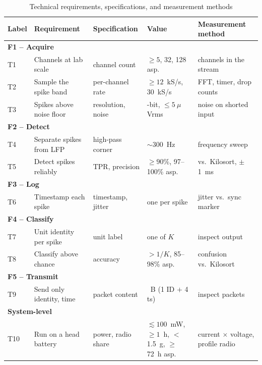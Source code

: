 \documentclass[11pt]{article}
\begin{document}
\begin{table}[H]
\centering
\caption{Technical requirements, specifications, and measurement methods}
\label{tab:techreq}
{\footnotesize\sffamily
\setlength{\tabcolsep}{4pt}
\renewcommand{\arraystretch}{1.2}
\begin{tabular}{|l|>{\raggedright\arraybackslash}p{106pt}|>{\raggedright\arraybackslash}p{78pt}|>{\raggedright\arraybackslash}p{90pt}|>{\raggedright\arraybackslash}p{112pt}|}
\hline
\textbf{Label} & \textbf{Requirement} & \textbf{Specification} & \textbf{Value} & \textbf{Measurement method} \\
\hline
\multicolumn{5}{|l|}{\textbf{F1 -- Acquire}} \\
\hline
T1  & Channels at lab scale & channel count & $\geq 5$, 32, 128 asp. & channels in the stream \\
\hline
T2  & Sample the spike band & per-channel rate & $\geq 12$~kS/s, 30~kS/s & FFT, timer, drop counts \\
\hline
T3  & Spikes above noise floor & resolution, noise & 16-bit, $\leq 5~\mu$Vrms & noise on shorted input \\
\hline
\multicolumn{5}{|l|}{\textbf{F2 -- Detect}} \\
\hline
T4  & Separate spikes from LFP & high-pass corner & $\sim$300~Hz & frequency sweep \\
\hline
T5  & Detect spikes reliably & TPR, precision & $\geq 90\%$, 97--100\% asp. & vs.\ Kilosort, $\pm$1~ms \\
\hline
\multicolumn{5}{|l|}{\textbf{F3 -- Log}} \\
\hline
T6  & Timestamp each spike & timestamp, jitter & one per spike & jitter vs.\ sync marker \\
\hline
\multicolumn{5}{|l|}{\textbf{F4 -- Classify}} \\
\hline
T7  & Unit identity per spike & unit label & one of $K$ & inspect output \\
\hline
T8  & Classify above chance & accuracy & $> 1/K$, 85--98\% asp. & confusion vs.\ Kilosort \\
\hline
\multicolumn{5}{|l|}{\textbf{F5 -- Transmit}} \\
\hline
T9  & Send only identity, time & packet content & 5~B (1 ID $+$ 4 ts) & inspect packets \\
\hline
\multicolumn{5}{|l|}{\textbf{System-level}} \\
\hline
T10 & Run on a head battery & power, radio share & $\lesssim 100$~mW, $\geq 1$~h, $<$1.5~g, $\geq$72~h asp. & current $\times$ voltage, profile radio \\
\hline
\end{tabular}
}
\end{table}
\end{document}

